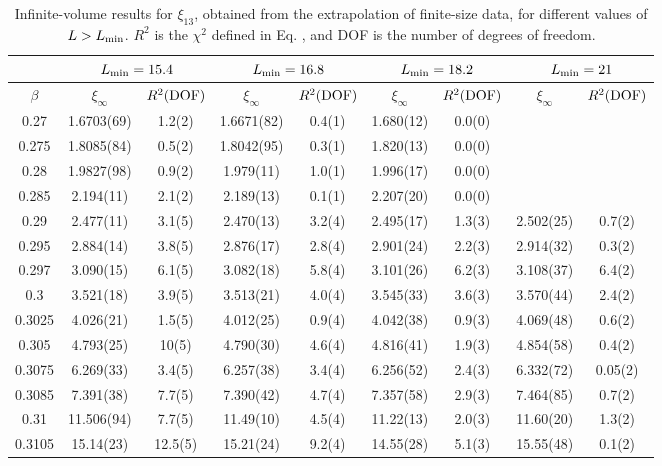 \documentclass[12pt]{article}
\newcommand{\text}{\rm}
\begin{document}
\begin{table}
\begin{center}
{
\scriptsize
\begin{tabular}{|c||c|c||c|c||c|c||c|c||}
\hline
 & 
\multicolumn{2}{|c|}{$L_{\text{min}} = 15.4$} &
\multicolumn{2}{|c|}{$L_{\text{min}} = 16.8$} &
\multicolumn{2}{|c|}{$L_{\text{min}} = 18.2$} &
\multicolumn{2}{|c|}{$L_{\text{min}} = 21$} \\
\hline
$\beta$ 
& $\xi_{\infty}$ & $R^2(\text{DOF})$ 
& $\xi_{\infty}$ & $R^2(\text{DOF})$ 
& $\xi_{\infty}$ & $R^2(\text{DOF})$ 
& $\xi_{\infty}$ & $R^2(\text{DOF})$ \\
\hline

0.27     & 1.6703(69) &   1.2(2)         & 1.6671(82) &   0.4(1)         & 1.680(12) &   0.0(0)  &  &   \\
0.275    & 1.8085(84) &   0.5(2)         & 1.8042(95) &   0.3(1)         & 1.820(13) &   0.0(0)  &  &   \\
0.28     & 1.9827(98) &   0.9(2)         & 1.979(11) &   1.0(1)  & 1.996(17) &   0.0(0)  &  &   \\
0.285    & 2.194(11) &   2.1(2)  & 2.189(13) &   0.1(1)  & 2.207(20) & 0.0(0)  &  &   \\
0.29     & 2.477(11) &   3.1(5)  & 2.470(13) &   3.2(4)  & 2.495(17) &   1.3(3)  & 2.502(25) &   0.7(2)\\
0.295    & 2.884(14) &   3.8(5)  & 2.876(17) &   2.8(4)  & 2.901(24) &   2.2(3)  & 2.914(32) &   0.3(2)\\
0.297    & 3.090(15) &   6.1(5)  & 3.082(18) &   5.8(4)  & 3.101(26) &   6.2(3)  & 3.108(37) &   6.4(2)\\
0.3      & 3.521(18) &   3.9(5)  & 3.513(21) &   4.0(4)  & 3.545(33) &   3.6(3)  & 3.570(44) &   2.4(2)\\
0.3025   & 4.026(21) &   1.5(5)  & 4.012(25) &   0.9(4)  & 4.042(38) &   0.9(3)  & 4.069(48) &   0.6(2)\\
0.305    & 4.793(25) &   10(5)         & 4.790(30) &   4.6(4)  & 4.816(41) &   1.9(3)  & 4.854(58) &   0.4(2)\\
0.3075   & 6.269(33) &   3.4(5)  & 6.257(38) &   3.4(4)  & 6.256(52) &   2.4(3)  & 6.332(72) &   0.05(2)\\
0.3085   & 7.391(38) &   7.7(5)  & 7.390(42) &   4.7(4)  & 7.357(58) &   2.9(3)  & 7.464(85) &   0.7(2)\\
0.31     & 11.506(94) &   7.7(5)         & 11.49(10) &   4.5(4)  & 11.22(13) &   2.0(3)  & 11.60(20) &   1.3(2)\\
0.3105   & 15.14(23) &   12.5(5)         & 15.21(24) &   9.2(4)  & 14.55(28) &   5.1(3)  & 15.55(48) &   0.1(2)\\
\hline

\end{tabular}
}
\end{center}
\caption{Infinite-volume results for $\xi_{13}$, obtained from the 
extrapolation of finite-size data, for different values of 
  $L>L_{\text{min}}$. $R^2$ is the $\chi^2$ defined in Eq.
  , and DOF is the number of degrees of freedom.}
\label{table:extr_xi}
\end{table}
\end{document}
